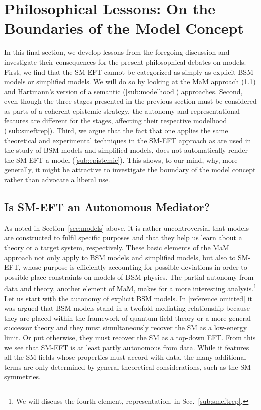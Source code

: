 \section{Philosophical Lessons: On the Boundaries of the Model Concept}	%
\label{sec:analysis}


In this final section, we develop  lessons from the foregoing discussion and investigate their consequences for the present philosophical debates on models. First, we find that the SM-EFT cannot be categorized as simply as explicit BSM models or simplified models. We will do so by looking at the MaM approach (\ref{sub:autonomy}) and Hartmann's version of a semantic (\ref{sub:modelhood}) approaches. Second, even though the three stages presented in the previous section must be considered as parts of a coherent epistemic strategy, the autonomy and representational features are different for the stages, affecting their respective modelhood (\ref{sub:smeftrep}).
Third, we argue that the fact that one applies the same theoretical and experimental techniques in the SM-EFT approach as are used in the study of BSM models and simplified models, does not automatically render the SM-EFT a model (\ref{sub:epistemic}). 
This shows, to our mind, why, more generally, it might be attractive to investigate the boundary of the model concept rather than advocate a liberal use. 


\subsection{Is SM-EFT an Autonomous Mediator?} %
\label{sub:autonomy}

As noted in Section~\ref{sec:models} above, it is rather uncontroversial that models are constructed to fulfil specific purposes and that they help us learn about a theory or a target system, respectively.
These basic elements of the MaM approach not only apply to BSM models and simplified models, but also to SM-EFT, whose purpose is efficiently accounting for possible deviations in order to possible place constraints on models of BSM physics. 
The partial autonomy from data and theory, another element of MaM, makes for a more interesting analysis.\footnote{We will discuss the fourth element, representation, in Sec.~\ref{sub:smeftrep}.}
Let us start with the autonomy of explicit BSM models.
In [reference omitted] it was argued that BSM models stand in a twofold mediating relationship because they are placed within the framework of quantum field theory or a more general successor theory and they must simultaneously recover the SM as a low-energy limit. 
Or put otherwise, they must recover the SM as a top-down EFT.
From this we see that SM-EFT is at least partly autonomous from data. While it features all the SM fields whose properties must accord with data, the many additional terms are only determined by general theoretical considerations, such as the SM symmetries.

